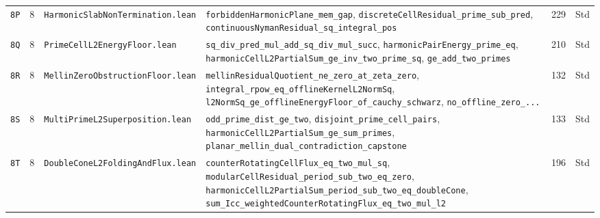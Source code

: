 \documentclass[11pt,a4paper]{article}
\theoremstyle{definition}
\begin{document}
\begin{longtable}{@{}ll>{\raggedright\arraybackslash}p{5.2cm}>{\raggedright\arraybackslash}p{6.8cm}cc@{}}
\texttt{8P} & 8 & \texttt{Harmonic\allowbreak Slab\allowbreak Non\allowbreak Termination.lean} & \texttt{forbiddenHarmonicPlane\_\allowbreak mem\_\allowbreak gap}, \texttt{discreteCellResidual\_\allowbreak prime\_\allowbreak sub\_\allowbreak pred}, \texttt{continuousNymanResidual\_\allowbreak sq\_\allowbreak integral\_\allowbreak pos} & 229 & Std \\
\texttt{8Q} & 8 & \texttt{Prime\allowbreak Cell\allowbreak L2\allowbreak Energy\allowbreak Floor.lean} & \texttt{sq\_div\_\allowbreak pred\_\allowbreak mul\_\allowbreak add\_\allowbreak sq\_\allowbreak div\_\allowbreak mul\_\allowbreak succ}, \texttt{harmonicPairEnergy\_\allowbreak prime\_\allowbreak eq}, \texttt{harmonicCellL2PartialSum\_\allowbreak ge\_\allowbreak inv\_\allowbreak two\_\allowbreak prime\_\allowbreak sq}, \texttt{ge\_\allowbreak add\_\allowbreak two\_\allowbreak primes} & 210 & Std \\
\texttt{8R} & 8 & \texttt{Mellin\allowbreak Zero\allowbreak Obstruction\allowbreak Floor.lean} & \texttt{mellinResidualQuotient\_\allowbreak ne\_\allowbreak zero\_\allowbreak at\_\allowbreak zeta\_\allowbreak zero}, \texttt{integral\_\allowbreak rpow\_\allowbreak eq\_\allowbreak offlineKernelL2NormSq}, \texttt{l2NormSq\_\allowbreak ge\_\allowbreak offlineEnergyFloor\_\allowbreak of\_\allowbreak cauchy\_\allowbreak schwarz}, \texttt{no\_\allowbreak offline\_\allowbreak zero\_\allowbreak ...} & 132 & Std \\
\texttt{8S} & 8 & \texttt{Multi\allowbreak Prime\allowbreak L2\allowbreak Superposition.lean} & \texttt{odd\_\allowbreak prime\_\allowbreak dist\_\allowbreak ge\_\allowbreak two}, \texttt{disjoint\_\allowbreak prime\_\allowbreak cell\_\allowbreak pairs}, \texttt{harmonicCellL2PartialSum\_\allowbreak ge\_\allowbreak sum\_\allowbreak primes}, \texttt{planar\_\allowbreak mellin\_\allowbreak dual\_\allowbreak contradiction\_\allowbreak capstone} & 133 & Std \\
\texttt{8T} & 8 & \texttt{Double\allowbreak Cone\allowbreak L2\allowbreak Folding\allowbreak And\allowbreak Flux.lean} & \texttt{counterRotatingCellFlux\_\allowbreak eq\_\allowbreak two\_\allowbreak mul\_\allowbreak sq}, \texttt{modularCellResidual\_\allowbreak period\_\allowbreak sub\_\allowbreak two\_\allowbreak eq\_\allowbreak zero}, \texttt{harmonicCellL2PartialSum\_\allowbreak period\_\allowbreak sub\_\allowbreak two\_\allowbreak eq\_\allowbreak doubleCone}, \texttt{sum\_\allowbreak Icc\_\allowbreak weightedCounterRotatingFlux\_\allowbreak eq\_\allowbreak two\_\allowbreak mul\_\allowbreak l2} & 196 & Std \\

\end{longtable}
\end{document}
